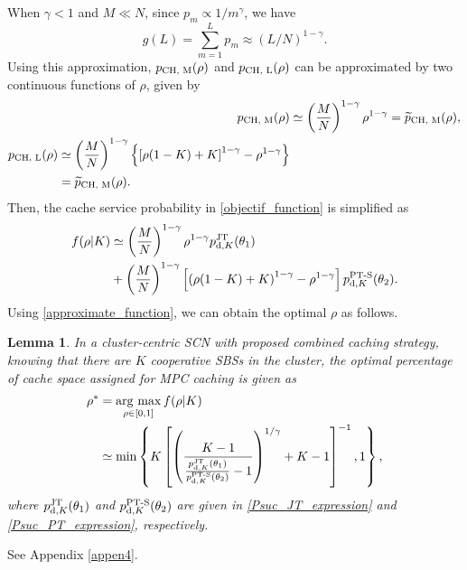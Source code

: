 \documentclass[twocolumns,10pt]{IEEEtran}
\newtheorem{lemma}{Lemma}
\newcommand{\argmax}{\mathop{\rm arg~max}\limits}
\begin{document}
When $\gamma<1$ and $M\ll N$, since $p_m \propto 1/ m^{\gamma}$, we have \cite{robert}
\begin{equation}
g(L)=\sum\limits_{m=1}^{L} p_{m}\approx (L/N)^{1-\gamma} .
\label{approximation}
\end{equation}
Using this approximation, $p_{\textnormal{CH, M}}(\rho)$ and $p_{\textnormal{CH, L}}(\rho)$ can be approximated by two continuous functions of $\rho$, given by
\begin{align}	
p_{\textnormal{CH, M}}(\rho)& \simeq \left(\frac{M}{N}\right)^{1-\gamma} \rho^{1-\gamma} = \widetilde{p}_{\textnormal{CH, M}}(\rho), \label{Cache_Prob_MPC_approxi}\\
\begin{split}
p_{\textnormal{CH, L}}(\rho)& \simeq \left(\frac{M}{N}\right)^{1-\gamma} \left\{\left[\rho(1-K)+K\right]^{1-\gamma}-\rho^{1-\gamma} \right\}\\
&= \widetilde{p}_{\textnormal{CH, M}}(\rho).
\end{split}
 \label{Cache_Prob_LCD_approxi}
\end{align}
Then, the cache service probability in \eqref{objectif_function} is simplified as
\begin{equation}
\begin{split}
f(\rho|K)&\simeq \left(\frac{M}{N}\right)^{1-\gamma} \rho^{1-\gamma} p_{\textnormal{d},K}^{\text{JT}}(\theta_1)  \\
&+ \left(\frac{M}{N}\right)^{1-\gamma} \left[\left(\rho(1-K)+K\right)^{1-\gamma}-\rho^{1-\gamma} \right]p_{\text{d},K}^{\text{PT-S} }(\theta_2).
\end{split}
\label{approximate_function}
\end{equation}
Using \eqref{approximate_function}, we can obtain the optimal $\rho$ as follows.


\begin{lemma}
	\label{lemma4}
	In a cluster-centric SCN with proposed combined caching strategy, knowing that there are $K$ cooperative SBSs in the cluster, the optimal percentage of cache space assigned for MPC caching is given as
	\begin{align}
	\rho^{*}&= \argmax_{\rho \in[0,1] } f(\rho|K) \nonumber\\
	&\simeq \min \left\{K\left[\left(\frac{K-1}{\frac{p_{\textnormal{d},K}^{\textnormal{JT}} (\theta_1) }{p_{\textnormal{d},K}^{\textnormal{PT-S}} (\theta_2) }-1}\right)^{1/\gamma}+K-1\right]^{-1} ,1\right\},
	\label{optimal_rho}
	\end{align}
	where $p_{\textnormal{d},K}^{\textnormal{JT}} (\theta_1)$ and $p_{\textnormal{d},K}^{\textnormal{PT-S}} (\theta_2)$ are given in \eqref{Psuc_JT_expression} and \eqref{Psuc_PT_expression}, respectively.
\end{lemma}
\begin{IEEEproof}
	\textnormal{See Appendix \ref{appen4}.}
\end{IEEEproof}
\end{document}
